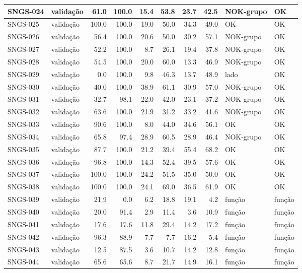 \begin{small}
\begin{longtable}{|l|l|r|r|r|r|r|r|l|l|}
SNGS-024 & validação & 61.0 & 100.0 & 15.4 & 53.8 & 23.7 & 42.5 & NOK-grupo & OK \\ \hline
SNGS-025 & validação & 100.0 & 100.0 & 19.0 & 50.0 & 34.3 & 49.0 & OK & OK \\ \hline
SNGS-026 & validação & 56.4 & 100.0 & 20.6 & 50.0 & 30.2 & 57.1 & NOK-grupo & OK \\ \hline
SNGS-027 & validação & 52.2 & 100.0 & 8.7 & 26.1 & 19.4 & 37.8 & NOK-grupo & OK \\ \hline
SNGS-028 & validação & 54.5 & 100.0 & 20.0 & 60.0 & 13.3 & 46.9 & NOK-grupo & OK \\ \hline
SNGS-029 & validação & 0.0 & 100.0 & 9.8 & 46.3 & 13.7 & 48.9 & lado & OK \\ \hline
SNGS-030 & validação & 40.0 & 100.0 & 38.9 & 61.1 & 30.9 & 57.0 & NOK-grupo & OK \\ \hline
SNGS-031 & validação & 32.7 & 98.1 & 22.0 & 42.0 & 23.1 & 37.2 & NOK-grupo & OK \\ \hline
SNGS-032 & validação & 63.6 & 100.0 & 21.9 & 31.2 & 33.2 & 41.6 & NOK-grupo & OK \\ \hline
SNGS-033 & validação & 90.6 & 100.0 & 8.0 & 44.0 & 34.6 & 56.1 & OK & OK \\ \hline
SNGS-034 & validação & 65.8 & 97.4 & 28.9 & 60.5 & 28.9 & 46.4 & NOK-grupo & OK \\ \hline
SNGS-035 & validação & 87.7 & 100.0 & 21.2 & 39.4 & 55.4 & 68.2 & OK & OK \\ \hline
SNGS-036 & validação & 96.8 & 100.0 & 14.3 & 52.4 & 39.5 & 57.6 & OK & OK \\ \hline
SNGS-037 & validação & 100.0 & 100.0 & 24.2 & 51.5 & 35.0 & 50.0 & OK & OK \\ \hline
SNGS-038 & validação & 100.0 & 100.0 & 24.1 & 69.0 & 36.5 & 61.9 & OK & OK \\ \hline
SNGS-039 & validação & 21.9 & 0.0 & 6.2 & 18.8 & 19.1 & 4.2 & função & função \\ \hline
SNGS-040 & validação & 20.0 & 91.4 & 2.9 & 11.4 & 3.6 & 10.9 & função & função \\ \hline
SNGS-041 & validação & 17.6 & 17.6 & 11.8 & 29.4 & 14.2 & 17.2 & função & função \\ \hline
SNGS-042 & validação & 96.3 & 88.9 & 7.7 & 7.7 & 16.2 & 5.4 & função & função \\ \hline
SNGS-043 & validação & 12.5 & 87.5 & 3.6 & 10.7 & 14.2 & 12.8 & função & função \\ \hline
SNGS-044 & validação & 65.6 & 65.6 & 8.7 & 21.7 & 14.9 & 16.1 & função & função \\ \hline

\end{longtable}
\end{small}
